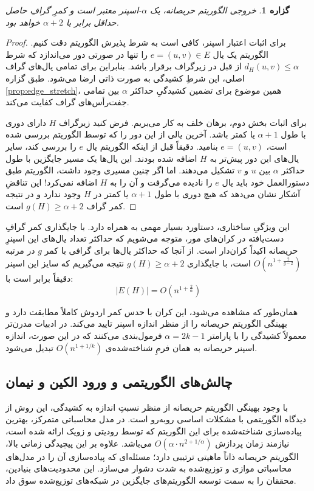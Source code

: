 \documentclass[11pt,a4paper]{report}
\theoremstyle{plain}
\newtheorem{prop}[thm]{\normalsize گزاره}
\theoremstyle{definition}
\theoremstyle{remark}
\begin{document}
\begin{prop}
خروجی الگوریتم حریصانه، یک $\alpha$-اسپنر معتبر است و کمرِ گرافِ حاصل حداقل برابر با $\alpha + 2$ خواهد بود.
\end{prop}
\begin{proof}
برای اثبات اعتبار اسپنر، کافی است به شرط پذیرش الگوریتم دقت کنیم. الگوریتم یک یال $e = (u,v) \in E$ را تنها در صورتی دور می‌اندازد که شرط $d_H(u,v) \le \alpha$ از قبل در زیرگراف برقرار باشد. بنابراین برای تمامی یال‌های گراف اصلی، این شرطِ کشیدگی به صورت ذاتی ارضا می‌شود. طبق گزاره \ref{prop:edge_stretch}، همین موضوع برای تضمین کشیدگیِ حداکثر $\alpha$ بین تمامی جفت‌رأس‌های گراف کفایت می‌کند.

برای اثبات بخش دوم، برهان خلف به کار می‌بریم. فرض کنید زیرگراف $H$ دارای دوری با طول $\alpha + 1$ یا کمتر باشد. آخرین یالی از این دور را که توسط الگوریتم بررسی شده است، $e = (u,v)$ بنامید. دقیقاً قبل از اینکه الگوریتم یال $e$ را بررسی کند، سایر یال‌های این دور پیش‌تر به $H$ اضافه شده بودند. این یال‌ها یک مسیر جایگزین با طول حداکثر $\alpha$ بین $u$ و $v$ تشکیل می‌دهند. اما اگر چنین مسیری وجود داشت، الگوریتم طبق دستورالعمل خود باید یال $e$ را نادیده می‌گرفت و آن را به $H$ اضافه نمی‌کرد! این تناقضِ آشکار نشان می‌دهد که هیچ دوری با طول $\alpha+1$ یا کمتر در $H$ وجود ندارد و در نتیجه کمر گراف $g(H) \ge \alpha + 2$ است.
\end{proof}

این ویژگیِ ساختاری، دستاورد بسیار مهمی به همراه دارد. با جایگذاری کمر گرافِ دست‌یافته در کران‌های مور، متوجه می‌شویم که حداکثر تعداد یال‌های این اسپنرِ حریصانه اکیداً کران‌دار است. از آنجا که حداکثر یال‌ها برای گرافی با کمر $g$ در مرتبه $O(n^{1 + \frac{2}{g-2}})$ است، با جایگذاری $g(H) \ge \alpha + 2$ نتیجه می‌گیریم که سایز این اسپنر دقیقاً برابر است با:
\[ |E(H)| = O\left(n^{1 + \frac{2}{\alpha}}\right) \]

همان‌طور که مشاهده می‌شود، این کران با حدس کمر اردوش کاملاً مطابقت دارد و بهینگی الگوریتم حریصانه را از منظر اندازه اسپنر تایید می‌کند. در ادبیات مدرن‌تر معمولاً کشیدگی را با پارامتر $\alpha = 2k - 1$ فرمول‌بندی می‌کنند که در این صورت، اندازه اسپنر حریصانه به همان فرمِ شناخته‌شده‌ی $O(n^{1 + 1/k})$ تبدیل می‌شود.

\subsection{چالش‌های الگوریتمی و ورود الکین و نیمان}
با وجود بهینگی الگوریتم حریصانه از منظر نسبتِ اندازه به کشیدگی، این روش از دیدگاه الگوریتمی با مشکلات اساسی روبه‌رو است. در مدل محاسباتی متمرکز، بهترین پیاده‌سازی شناخته‌شده برای این الگوریتم که توسط رودیتی و زویک \cite{roditty2004dynamic} ارائه شده است، نیازمند زمان پردازش $O(\alpha \cdot n^{2+1/\alpha})$ می‌باشد. علاوه بر این پیچیدگی زمانی بالا، الگوریتم حریصانه ذاتاً ماهیتی ترتیبی دارد؛ مسئله‌ای که پیاده‌سازی آن را در مدل‌های محاسباتی موازی و توزیع‌شده به شدت دشوار می‌سازد. این محدودیت‌های بنیادین، محققان را به سمت توسعه الگوریتم‌های جایگزین در شبکه‌های توزیع‌شده سوق داد.
\end{document}
